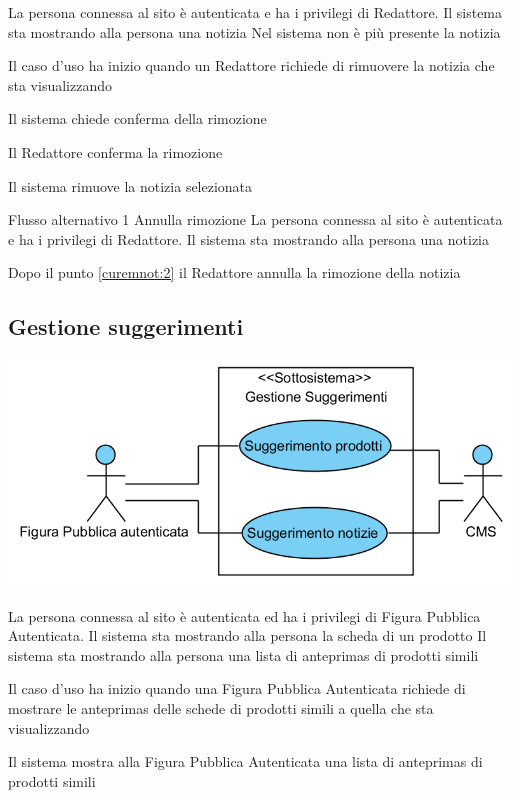 {}
{La persona connessa al sito è autenticata e ha i privilegi di Redattore. Il sistema sta mostrando alla persona una notizia}
{Nel sistema non è più presente la notizia}
{\begin{enumCU}
	\item Il caso d'uso ha inizio quando un Redattore richiede di rimuovere la notizia che sta visualizzando
	\item Il sistema chiede conferma della rimozione\label{curemnot:2}
	\item Il Redattore conferma la rimozione
	\item Il sistema rimuove la notizia selezionata
\end{enumCU}}
%
{Flusso alternativo 1}%
{Annulla rimozione}%
{La persona connessa al sito è autenticata e ha i privilegi di Redattore. Il sistema sta mostrando alla persona una notizia}%
{\postNulle}%
{\begin{enumCU}
		\item Dopo il punto \ref{curemnot:2} il Redattore annulla la rimozione della notizia
	\end{enumCU}}%

\subsection{Gestione suggerimenti}
\begin{center}
   \includegraphics[width=\textwidth]{assets/visualParadigm/cu/GestioneSuggerimenti}
\end{center}
{}
{La persona connessa al sito è autenticata ed ha i privilegi di Figura Pubblica Autenticata. Il sistema sta mostrando alla persona la scheda di un prodotto}
{Il sistema sta mostrando alla persona una lista di \glspl{anteprima} di prodotti simili}
{\begin{enumCU}
	\item Il caso d'uso ha inizio quando una Figura Pubblica Autenticata richiede di mostrare le \glspl{anteprima} delle schede di prodotti simili a quella che sta visualizzando
	\item Il sistema mostra alla Figura Pubblica Autenticata una lista di \glspl{anteprima} di prodotti simili
\end{enumCU}}

